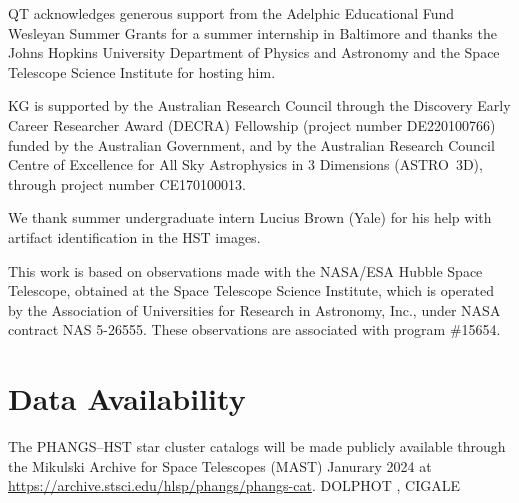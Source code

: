 \documentclass[]{aastex631}
\begin{document}
QT acknowledges generous support from the Adelphic Educational Fund Wesleyan Summer Grants for a summer internship in Baltimore and thanks the Johns Hopkins University Department of Physics and Astronomy and the Space Telescope Science Institute for hosting him.

KG is supported by the Australian Research Council through the Discovery Early Career Researcher Award (DECRA) Fellowship (project number DE220100766) funded by the Australian Government, and by the Australian Research Council Centre of Excellence for All Sky Astrophysics in 3 Dimensions (ASTRO~3D), through project number CE170100013.

We thank summer undergraduate intern Lucius Brown (Yale) for his help with artifact identification in the HST images.

This work is based on observations made with the NASA/ESA Hubble Space Telescope, obtained at the Space Telescope Science Institute, which is operated by the Association of Universities for Research in Astronomy, Inc., under NASA contract NAS 5-26555. These observations are associated with program \#15654. 


\section*{Data Availability}
The PHANGS--HST star cluster catalogs will be made publicly available through the Mikulski Archive for Space Telescopes (MAST) Janurary 2024 at \url{https://archive.stsci.edu/hlsp/phangs/phangs-cat}.
{DOLPHOT \citep[v2.0][]{dolphin_dolphot_2016}, CIGALE \citep{burgarella_star_2005,noll_analysis_2009,boquien_cigale_2019}}

{}

%   
% 



\appendix
\end{document}
